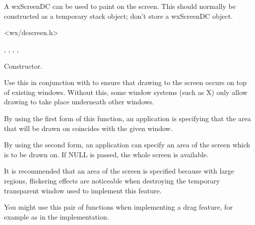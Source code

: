 \section{}\label{wxscreendc}

A wxScreenDC can be used to paint on the screen.
This should normally be constructed as a temporary stack object; don't store
a wxScreenDC object.




<wx/dcscreen.h>


, , ,\rtfsp
{}, 




Constructor.

\label{wxscreendcstartdrawingontop}



Use this in conjunction with  to
ensure that drawing to the screen occurs on top of existing windows. Without this,
some window systems (such as X) only allow drawing to take place underneath
other windows.

By using the first form of this function, an application is specifying that
the area that will be drawn on coincides with the given window.

By using the second form, an application can specify an area of the screen
which is to be drawn on. If NULL is passed, the whole screen is available.

It is recommended that an area of the screen is specified because with large regions,
flickering effects are noticeable when destroying the temporary transparent window used
to implement this feature.

You might use this pair of functions when implementing a drag feature, for example
as in the  implementation.

